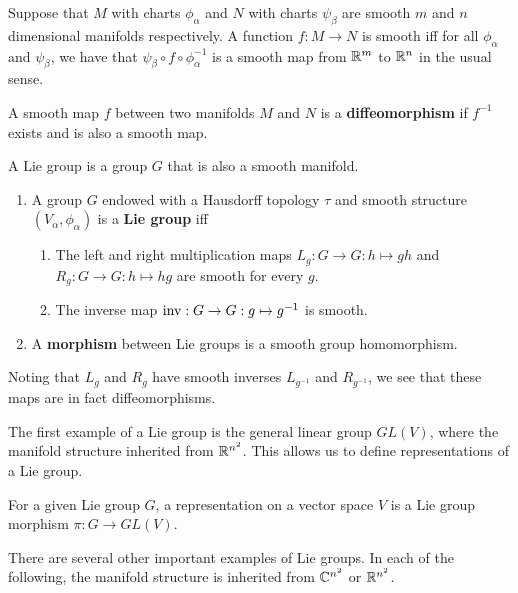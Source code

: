 \documentclass[a4paper]{article}
\begin{document}
\begin{defi}
    Suppose that $M$ with charts $\phi_\alpha$ and $N$ with charts $\psi_\beta$ are smooth $m$ and $n$ dimensional manifolds respectively. A function $f: M \to N$ is smooth iff for all $\phi_\alpha$ and $\psi_\beta$, we have that $\psi_\beta \circ f \circ \phi_\alpha^{-1}$ is a smooth map from $\mathbb{R}^m$ to $\mathbb{R}^n$ in the usual sense.
\end{defi}

\begin{defi}[Diffeomorphism]
    A smooth map $f$ between two manifolds $M$ and $N$ is a \textbf{diffeomorphism} if $f^{-1}$ exists and is also a smooth map.
\end{defi}

A Lie group is a group $G$ that is also a smooth manifold. 

\begin{defi}\end{defi}
\begin{enumerate}
    \item A group $G$ endowed with a Hausdorff topology $\tau$ and smooth structure $(V_\alpha, \phi_\alpha)$ is a \textbf{Lie group} iff
    \begin{enumerate}
        \item The left and right multiplication maps $L_g : G \to G : h \mapsto gh$ and $R_g : G \to G : h \mapsto hg$ are smooth for every $g$.
        \item The inverse map $\operatorname{inv}: G \to G : g \mapsto g^{-1}$  is smooth.
    \end{enumerate}
    \item A \textbf{morphism} between Lie groups is a smooth group homomorphism.
\end{enumerate}

Noting that $L_g$ and $R_g$ have smooth inverses $L_{g^{-1}}$ and $R_{g^{-1}}$, we see that these maps are in fact diffeomorphisms.

The first example of a Lie group is the general linear group $GL(V)$, where the manifold structure inherited from $\mathbb{R}^{n^2}$. This allows us to define representations of a Lie group.

\begin{defi}
    For a given Lie group $G$, a representation on a vector space $V$ is a Lie group morphism $\pi: G \to GL(V)$.
\end{defi}

There are several other important examples of Lie groups. In each of the following, the manifold structure is inherited from $\mathbb{C}^{n^2}$ or $\mathbb{R}^{n^2}$. 
\end{document}
